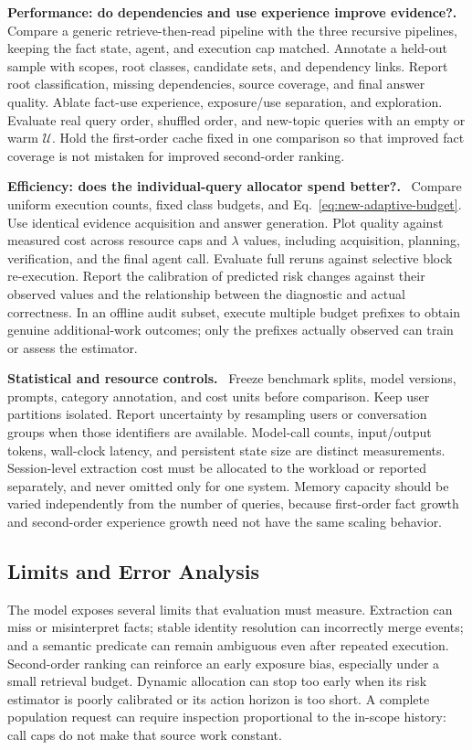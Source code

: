 \documentclass[10pt,twocolumn]{article}
\newcommand{\Uu}{\mathcal{U}}
\newcommand{\runin}[1]{\smallskip\noindent\textbf{#1.}\ }
\begin{document}
\runin{Performance: do dependencies and use experience improve evidence?}
Compare a generic retrieve-then-read pipeline with the three recursive
pipelines, keeping the fact state, agent, and execution cap matched.
Annotate a held-out sample with scopes, root classes, candidate sets,
and dependency links. Report root classification, missing dependencies,
source coverage, and final answer quality. Ablate fact-use experience,
exposure/use separation, and exploration. Evaluate real query order,
shuffled order, and new-topic queries with an empty or warm $\Uu$.
Hold the first-order cache fixed in one comparison so that improved
fact coverage is not mistaken for improved second-order ranking.

\runin{Efficiency: does the individual-query allocator spend better?}
Compare uniform execution counts, fixed class budgets, and
Eq.~\eqref{eq:new-adaptive-budget}. Use identical evidence acquisition
and answer generation. Plot quality against measured cost across
resource caps and $\lambda$ values, including acquisition, planning,
verification, and the final agent call. Evaluate full reruns against
selective block re-execution. Report the calibration of predicted risk
changes against their observed values and the relationship between the
diagnostic and actual correctness. In an offline audit subset, execute
multiple budget prefixes to obtain genuine additional-work outcomes;
only the prefixes actually observed can train or assess the estimator.

\runin{Statistical and resource controls}
Freeze benchmark splits, model versions, prompts, category annotation,
and cost units before comparison. Keep user partitions isolated.
Report uncertainty by resampling users or conversation groups when
those identifiers are available. Model-call counts, input/output
tokens, wall-clock latency, and persistent state size are distinct
measurements. Session-level extraction cost must be allocated to the
workload or reported separately, and never omitted only for one system.
Memory capacity should be varied independently from the number of
queries, because first-order fact growth and second-order experience
growth need not have the same scaling behavior.

\subsection{Limits and Error Analysis}
\label{subsec:new-limitations}

The model exposes several limits that evaluation must measure.
Extraction can miss or misinterpret facts; stable identity resolution
can incorrectly merge events; and a semantic predicate can remain
ambiguous even after repeated execution. Second-order ranking can
reinforce an early exposure bias, especially under a small retrieval
budget. Dynamic allocation can stop too early when its risk estimator
is poorly calibrated or its action horizon is too short. A complete
population request can require inspection proportional to the in-scope
history: call caps do not make that source work constant.
\end{document}
